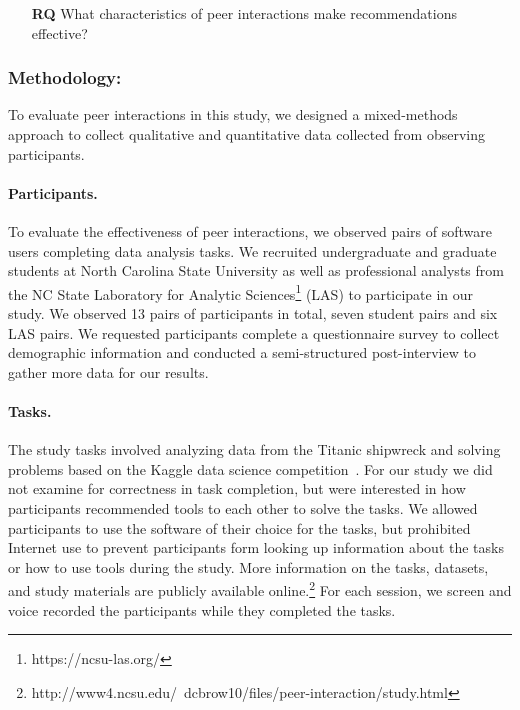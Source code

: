 \begin{itemize}
  \item[\textbf{RQ}] What characteristics of peer interactions make recommendations effective?
\end{itemize}

\subsubsection{Methodology:}

To evaluate peer interactions in this study, we designed a mixed-methods approach to collect qualitative and quantitative data collected from observing participants.

\paragraph{Participants.} To evaluate the effectiveness of peer interactions, we observed pairs of software users completing data analysis tasks. We recruited undergraduate and graduate students at North Carolina State University as well as professional analysts from the NC State Laboratory for Analytic Sciences\footnote{https://ncsu-las.org/} (LAS) to participate in our study. We observed 13 pairs of participants in total, seven student pairs and six LAS pairs. We requested participants complete a questionnaire survey to collect demographic information and conducted a semi-structured post-interview to gather more data for our results. 

\paragraph{Tasks.} The study tasks involved analyzing data from the Titanic shipwreck and solving problems based on the Kaggle data science competition~\cite{KaggleTitanic}. For our study we did not examine for correctness in task completion, but were interested in how participants recommended tools to each other to solve the tasks. We allowed participants to use the software of their choice for the tasks, but prohibited Internet use to prevent participants form looking up information about the tasks or how to use tools during the study. More information on the tasks, datasets, and study materials are publicly available online.\footnote{http://www4.ncsu.edu/~dcbrow10/files/peer-interaction/study.html} For each session, we screen and voice recorded the participants while they completed the tasks.

